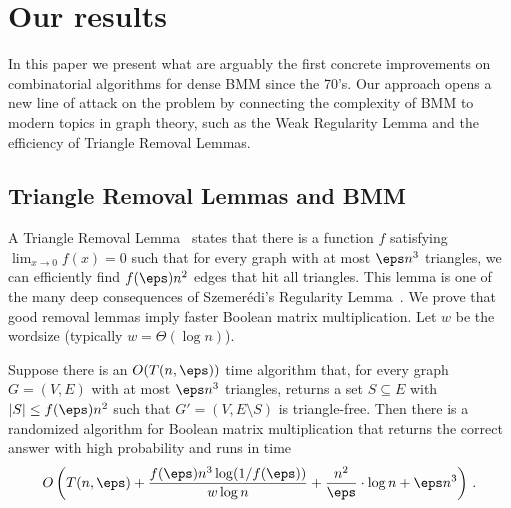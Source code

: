 \section{Our results}

In this paper we present what are arguably the first concrete improvements on combinatorial algorithms for dense BMM since the 70's. Our approach opens a new line of attack on the problem by connecting the complexity of BMM to modern topics in graph theory, such as the Weak Regularity Lemma and the efficiency of Triangle Removal Lemmas.

\subsection{Triangle Removal Lemmas and BMM}

A Triangle Removal Lemma~\cite{RuzsaSz,Green} states that there is a function $f$ satisfying $\lim_{x \rightarrow 0} f(x) = 0$ such that for every graph with at most $\eps n^3$ triangles, we can efficiently find $f(\eps) n^2$ edges that hit all triangles. This lemma is one of the many deep consequences of Szemer\'{e}di's Regularity Lemma~\cite{sz}. We prove that good removal lemmas imply faster Boolean matrix multiplication. Let $w$ be the wordsize (typically $w = \Theta(\log n)$).

\begin{theorem} \label{boolmmtriangles} Suppose there is an $O(T(n,\eps))$ time algorithm that, for every graph $G=(V,E)$ with at most $\eps n^3$ triangles, returns a set $S \subseteq E$ with $|S| \leq f(\eps) n^2$ such that $G'=(V,E\setminus S)$ is triangle-free. Then there is a randomized algorithm for Boolean matrix multiplication that returns the correct answer with high probability and runs in time
%
 \[
O\left(T(n,\eps) + \frac{f(\eps) n^3 \log (1/f(\eps))}{w \log n} + \frac{n^2}{\eps} \cdot \log n + \eps n^3\right)\,.
\]
%
\end{theorem}
